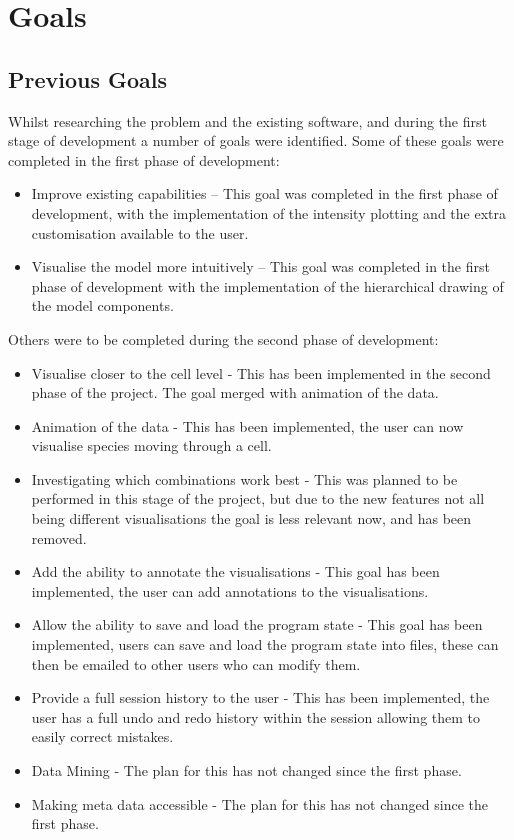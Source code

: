 \section{Goals}

\subsection{Previous Goals}
Whilst researching the problem and the existing software, and during the first stage of development a number of goals were identified.  Some of these goals were completed in the first phase of development:

\begin{itemize}
\item Improve existing capabilities -- This goal was completed in the first phase of development, with the implementation of the intensity plotting and the extra customisation available to the user.
\item Visualise the model more intuitively -- This goal was completed in the first phase of development with the implementation of the hierarchical drawing of the model components.
\end{itemize}

Others were to be completed during the second phase of development:

\begin{itemize}
\item Visualise closer to the cell level - This has been implemented in the second phase of the project.  The goal merged with animation of the data.
\item Animation of the data - This has been implemented, the user can now visualise species moving through a cell.
\item Investigating which combinations work best - This was planned to be performed in this stage of the project, but due to the new features not all being different visualisations the goal is less relevant now, and has been removed.
\item Add the ability to annotate the visualisations - This goal has been implemented, the user can add annotations to the visualisations.
\item Allow the ability to save and load the program state - This goal has been implemented, users can save and load the program state into files, these can then be emailed to other users who can modify them.
\item Provide a full session history to the user - This has been implemented, the user has a full undo and redo history within the session allowing them to easily correct mistakes.
\item Data Mining - The plan for this has not changed since the first phase.
\item Making meta data accessible - The plan for this has not changed since the first phase.
\end{itemize}

